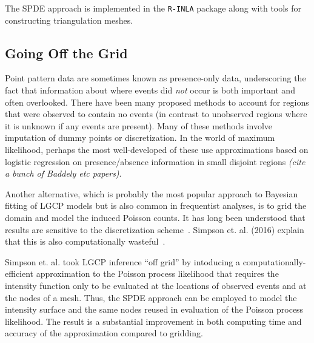 \documentclass[]{interact}
\begin{document}
The SPDE approach is implemented in the \texttt{R-INLA} package along with
tools for constructing triangulation meshes.


\subsection{Going Off the Grid}

Point pattern data are sometimes known as presence-only data, underscoring
the fact that information about where events did \emph{not} occur is both
important and often overlooked. There have been many proposed methods to
account for regions that were observed to contain no events (in contrast to
unobserved regions where it is unknown if any events are present). Many of
these methods involve imputation of dummy points or discretization. In the
world of maximum likelihood, perhaps the most well-developed of these use
approximations based on logistic regression on presence/absence information in
small disjoint regions {\it (cite a bunch of Baddely etc papers)}.

Another alternative, which is probably the most popular approach to Bayesian
fitting of LGCP models but is also common in frequentist analyses, is to grid
the domain and model the induced Poisson counts. It has long been understood
that results are sensitive to the discretization scheme~\cite{brixmoeller}.
Simpson et. al. (2016) explain that this is also computationally
wasteful~\cite{simpsonetal}.

Simpson et. al. took LGCP inference ``off grid'' by intoducing a
computationally-efficient approximation to the Poisson process likelihood that
requires the intensity function only to be evaluated at the locations of
observed events and at the nodes of a mesh. Thus, the SPDE approach can be
employed to model the intensity surface and the same nodes reused in
evaluation of the Poisson process likelihood. The result is a substantial
improvement in both computing time and accuracy of the approximation compared
to gridding.

\end{document}

